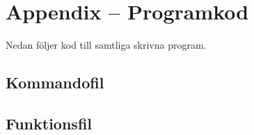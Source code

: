 \appendix
\section{Appendix -- Programkod}
\label{sec:appendix}

Nedan följer kod till samtliga skrivna program.

\subsection{Kommandofil}

	

\subsection{Funktionsfil}

	